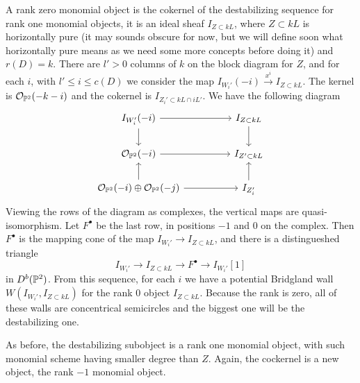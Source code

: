 \documentclass[
	oldfontcommands,
	sumario=abnt-6027-2012,
	12pt,			%
	openright,		%
	oneside,		%
	a4paper,		%
	english,		%
	brazil			%
	]{imecc-unicamp}
\begin{document}
A rank zero monomial object is the cokernel of the destabilizing sequence for rank one monomial objects, it is an ideal sheaf $I_{Z\subset kL}$, where $Z\subset kL$ is horizontally pure (it may sounds obscure for now, but we will define soon what horizontally pure means as we need some more concepts before doing it) and $r(D)=k$. There are $l'>0$ columns of $k$ on the block diagram for $Z$, and for each $i$, with $l'\le i\le c(D)$ we consider the map $I_{W_i'}(-i)\xrightarrow{x^i} I_{Z\subset kL}$. The kernel is ${\mathcal O}_{{\mathbb P}^2}(-k-i)$ and the cokernel is $I_{Z_i'\subset kL\cap iL'}$. We have the following diagram $$
\begin{tikzcd}
I_{W_i'}(-i) \arrow[rr] \arrow[d]                          &  & I_{Z\subset kL} \arrow[d] \\
\mathcal O_{\PP^2}(-i) \arrow[rr]                          &  & I_{Z'\subset kL}          \\
\OO_{\PP^2}(-i)\oplus \OO_{\PP^2}(-j) \arrow[rr] \arrow[u] &  & I_{Z_i'} \arrow[u]       
\end{tikzcd}
$$ 
Viewing the rows of the diagram as complexes, the vertical maps are quasi-isomorphism. Let $F^\bullet$ be the last row, in positions $-1$ and $0$ on the complex. Then $F^\bullet$ is the mapping cone of the map $I_{W_i'}\rightarrow I_{Z\subset kL}$, and there is a distingueshed triangle
$$I_{W_i'}\rightarrow I_{Z\subset kL}\rightarrow F^\bullet\rightarrow I_{W_i'}[1]$$
in $D^b({\mathbb P}^2)$. From this sequence, for each $i$ we have a potential Bridgland wall $W(I_{W_i'},I_{Z\subset kL})$ for the rank $0$ object $I_{Z\subset kL}$. Because the rank is zero, all of these walls are concentrical semicircles and the biggest one will be the destabilizing one. 

As before, the destabilizing subobject is a rank one monomial object, with such monomial scheme having smaller degree than $Z$. Again, the cockernel is a new object, the rank $-1$ monomial object.
\end{document}
